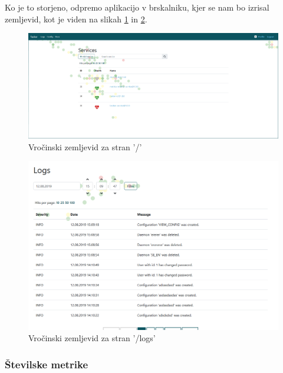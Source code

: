 \documentclass[a4paper, 12pt]{book}
\begin{document}
Ko je to storjeno, odpremo aplikacijo v brskalniku, kjer se nam bo izrisal zemljevid, kot je viden na slikah \ref{img:heatmap1} in \ref{img:heatmap2}.

\begin{figure}[h]
	\begin{center}
		\includegraphics[width=1\textwidth]{heatmap_1.png}
	\end{center}
	\caption{Vročinski zemljevid za stran '/'}
	\label{img:heatmap1}
\end{figure}

\begin{figure}[h]
	\begin{center}
		\includegraphics[width=1\textwidth]{heatmap_2.png}
	\end{center}
	\caption{Vročinski zemljevid  za stran '/logs'}
	\label{img:heatmap2}
\end{figure}

\subsubsection{Številske metrike}
\end{document}
